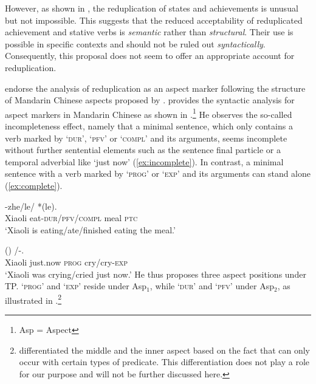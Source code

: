 However, as shown in , the reduplication of states and achievements is unusual but not impossible.
This suggests that the reduced acceptability of reduplicated achievement and stative verbs is \textit{semantic} rather than \textit{structural}. 
Their use is possible in specific contexts and should not be ruled out \textit{syntactically}.
Consequently, this proposal does not seem to offer an appropriate account for  reduplication.
 
 
 
 
 
 \citet[229]{YangWei2017} endorse the analysis of  reduplication as an aspect marker following the structure of Mandarin Chinese aspects proposed by \citet{Tsai2008}.
 \citet{Tsai2008} provides the syntactic analysis for aspect markers in Mandarin Chinese as shown in .\footnote{Asp = Aspect}
 He observes the so-called incompleteness effect, namely that a minimal sentence, 
 which only contains a verb marked by  `\textsc{dur}',
  `\textsc{pfv}' or  `\textsc{compl}' 
 and its arguments, 
 seems incomplete without further sentential elements 
 such as the sentence final particle  
 or a temporal adverbial like  `just now' (\ref{ex:incomplete}). 
 In contrast, a minimal sentence with a verb marked by   `\textsc{prog}' or 
 `\textsc{exp}'  and its arguments can stand alone (\ref{ex:complete}).
 
\ea\label{ex:incomplete}
 \gll {} -zhe/le/  *(le).\\
 Xiaoli eat-\textsc{dur}/\textsc{pfv}/\textsc{compl} meal \textsc{ptc}\\
 \glt `Xiaoli is eating/ate/finished eating the meal.'
\z

\ea\label{ex:complete}
\gll {} ()  /-.\\
Xiaoli just.now \textsc{prog} cry/cry-\textsc{exp}\\
\glt `Xiaoli was crying/cried just now.'
\z
He thus proposes three aspect positions under TP.  `\textsc{prog}' and  `\textsc{exp}' reside under Asp$_1$, 
while  `\textsc{dur}' and  `\textsc{pfv}' under Asp$_2$, as illustrated in .\footnote{
    \citet{Tsai2008} differentiated the middle and the inner aspect based on the fact that 
     can only occur with certain types of predicate.
     This differentiation does not play a role for our purpose and will not be further discussed here.}

